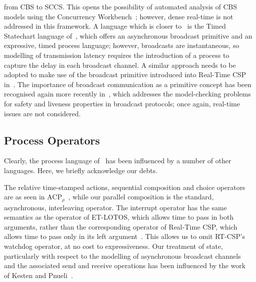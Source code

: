 from CBS to SCCS. This opens the possibility of automated analysis of
CBS models using the Concurrency Workbench~\cite{cps:93}; however,
dense real-time is not addressed in this framework.  A language which
is closer to \bcandle\ is the Timed Statechart language
of~\cite{kp:92}, which offers an asynchronous broadcast primitive and
an expressive, timed process language; however, broadcasts are
instantaneous, so modelling of transmission latency requires the
introduction of a process to capture the delay in each broadcast
channel. A similar approach needs to be adopted to make use of the
broadcast primitive introduced into Real-Time CSP
in~\cite{djs:92}. The importance of broadcast communication as a
primitive concept has been recognised again more recently
in~\cite{efm:99}, which addresses the model-checking problems for
safety and liveness properties in broadcast protocols; once again,
real-time issues are not considered.
 
\subsection{Process Operators}
Clearly, the process language of \bcandle\ has been influenced by
a number of other languages. Here, we briefly acknowledge our debts.

The relative time-stamped actions, sequential composition and choice
operators are as seen in $\text{ACP}_\rho$~\cite{bb:91}, while our
parallel composition is the standard, asynchronous, interleaving
operator. The interrupt operator has the same semantics as the
operator of ET-LOTOS, which allows time to pass in both arguments,
rather than the corresponding operator of Real-Time CSP, which allows
time to pass only in its left argument~\cite{bds:94}. This allows us
to omit RT-CSP's watchdog operator, at no cost to expressiveness. Our
treatment of state, particularly with respect to the modelling of
asynchronous broadcast channels and the associated send and receive
operations has been influenced by the work of Kesten and
Pnueli~\cite{kp:92}.
















